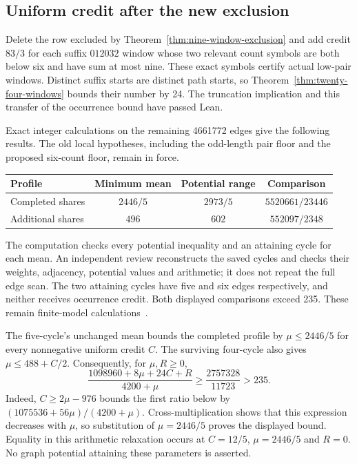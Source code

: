 \documentclass[11pt,a4paper]{article}
\theoremstyle{definition}
\theoremstyle{remark}
\begin{document}
\subsection{Uniform credit after the new exclusion}\label{sec:credit-after-exclusion}
Delete the row excluded by Theorem~\ref{thm:nine-window-exclusion} and add
credit $83/3$ for each suffix $012032$ window whose two relevant count
symbols are both below six and have sum at most nine. These exact symbols
certify actual low-pair windows. Distinct suffix starts are distinct path
starts, so Theorem~\ref{thm:twenty-four-windows} bounds their number by 24.
The truncation implication and this transfer of the occurrence bound have
passed Lean.

Exact integer calculations on the remaining 4661772 edges give the
following results. The old local hypotheses, including the odd-length
pair floor and the proposed six-count floor, remain in force.
\begin{center}
\begin{tabular}{lccc}
\toprule
Profile & Minimum mean & Potential range & Comparison\\
\midrule
Completed shares & $2446/5$ & $2973/5$ & $5520661/23446$\\
Additional shares & $496$ & $602$ & $552097/2348$\\
\bottomrule
\end{tabular}
\end{center}
The computation checks every potential inequality and an attaining cycle
for each mean. An independent review reconstructs the saved cycles and
checks their weights, adjacency, potential values and arithmetic; it does
not repeat the full edge scan. The two attaining cycles have five and six
edges respectively, and neither receives occurrence credit. Both displayed
comparisons exceed 235. These remain finite-model calculations~\cite{credit139archive}.

The five-cycle's unchanged mean bounds the completed profile by
$\mu\le2446/5$ for every nonnegative uniform credit $C$. The surviving
four-cycle also gives $\mu\le488+C/2$. Consequently, for $\mu,R\ge0$,
\[
\frac{1098960+8\mu+24C+R}{4200+\mu}
\ge \frac{2757328}{11723}>235.
\]
Indeed, $C\ge2\mu-976$ bounds the first ratio below by
$(1075536+56\mu)/(4200+\mu)$. Cross-multiplication shows that this expression
decreases with $\mu$, so substitution of $\mu=2446/5$ proves the displayed
bound. Equality in this arithmetic relaxation occurs at
$C=12/5$, $\mu=2446/5$ and $R=0$. No graph potential attaining these
parameters is asserted.
\end{document}
